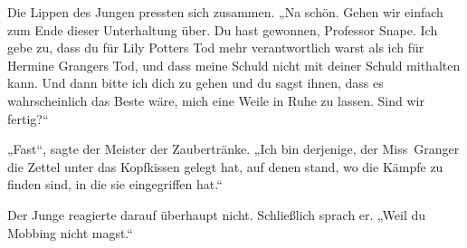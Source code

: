Die Lippen des Jungen pressten sich zusammen.
„Na schön. Gehen wir einfach zum Ende dieser Unterhaltung über. Du hast gewonnen, Professor Snape. Ich gebe zu, dass du für Lily Potters Tod mehr verantwortlich warst als ich für Hermine Grangers Tod, und dass meine Schuld nicht mit deiner Schuld mithalten kann. Und dann bitte ich dich zu gehen und du sagst ihnen, dass es wahrscheinlich das Beste wäre, mich eine Weile in Ruhe zu lassen. Sind wir fertig?“

„Fast“, sagte der Meister der Zaubertränke. „Ich bin derjenige, der Miss~Granger die Zettel unter das Kopfkissen gelegt hat, auf denen stand, wo die Kämpfe zu finden sind, in die sie eingegriffen hat.“

Der Junge reagierte darauf überhaupt nicht. Schließlich sprach er. „Weil du Mobbing nicht magst.“

